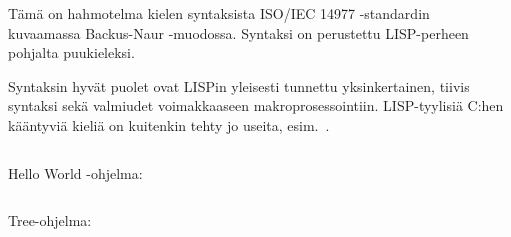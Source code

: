 
Tämä on hahmotelma kielen syntaksista ISO/IEC 14977
-standardin~\citep{iso14977} kuvaamassa Backus-Naur -muodossa. Syntaksi on
perustettu LISP-perheen pohjalta puukieleksi.

Syntaksin hyvät puolet ovat LISPin yleisesti tunnettu yksinkertainen, tiivis
syntaksi sekä valmiudet voimakkaaseen makroprosessointiin. LISP-tyylisiä C:hen
kääntyviä kieliä on kuitenkin tehty jo useita, esim.~\citet{clisp3}.

\inputminted{abnf}{lisp-base.bnf}

Hello World -ohjelma:

\inputminted{lisp}{hello.lisp}

\newpage

Tree-ohjelma:

\inputminted{lisp}{tree.lisp}
